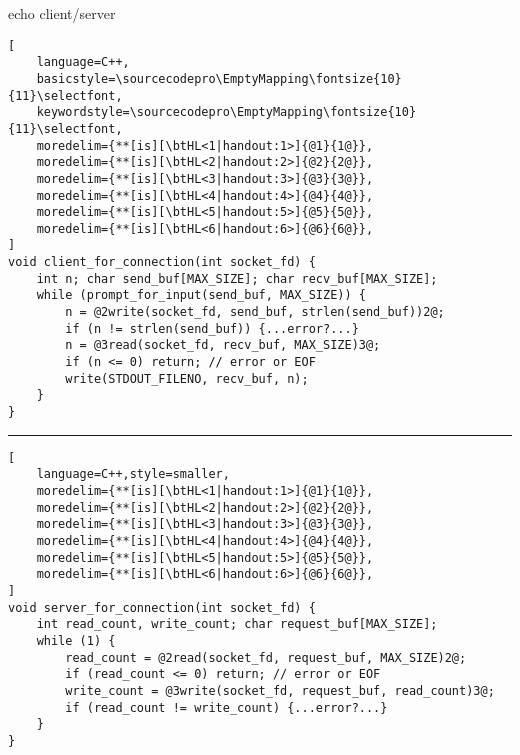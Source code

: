 
\begin{frame}[fragile,label=echoClient]{echo client/server}
\begin{lstlisting}[
    language=C++,
    basicstyle=\sourcecodepro\EmptyMapping\fontsize{10}{11}\selectfont,
    keywordstyle=\sourcecodepro\EmptyMapping\fontsize{10}{11}\selectfont,
    moredelim={**[is][\btHL<1|handout:1>]{@1}{1@}},
    moredelim={**[is][\btHL<2|handout:2>]{@2}{2@}},
    moredelim={**[is][\btHL<3|handout:3>]{@3}{3@}},
    moredelim={**[is][\btHL<4|handout:4>]{@4}{4@}},
    moredelim={**[is][\btHL<5|handout:5>]{@5}{5@}},
    moredelim={**[is][\btHL<6|handout:6>]{@6}{6@}},
]
void client_for_connection(int socket_fd) {
    int n; char send_buf[MAX_SIZE]; char recv_buf[MAX_SIZE];
    while (prompt_for_input(send_buf, MAX_SIZE)) {
        n = @2write(socket_fd, send_buf, strlen(send_buf))2@;
        if (n != strlen(send_buf)) {...error?...}
        n = @3read(socket_fd, recv_buf, MAX_SIZE)3@;
        if (n <= 0) return; // error or EOF 
        write(STDOUT_FILENO, recv_buf, n);
    }
}
\end{lstlisting}
\hrule
\begin{lstlisting}[
    language=C++,style=smaller,
    moredelim={**[is][\btHL<1|handout:1>]{@1}{1@}},
    moredelim={**[is][\btHL<2|handout:2>]{@2}{2@}},
    moredelim={**[is][\btHL<3|handout:3>]{@3}{3@}},
    moredelim={**[is][\btHL<4|handout:4>]{@4}{4@}},
    moredelim={**[is][\btHL<5|handout:5>]{@5}{5@}},
    moredelim={**[is][\btHL<6|handout:6>]{@6}{6@}},
]
void server_for_connection(int socket_fd) {
    int read_count, write_count; char request_buf[MAX_SIZE];
    while (1) {
        read_count = @2read(socket_fd, request_buf, MAX_SIZE)2@;
        if (read_count <= 0) return; // error or EOF 
        write_count = @3write(socket_fd, request_buf, read_count)3@;
        if (read_count != write_count) {...error?...}
    }
}
\end{lstlisting}
\end{frame}
